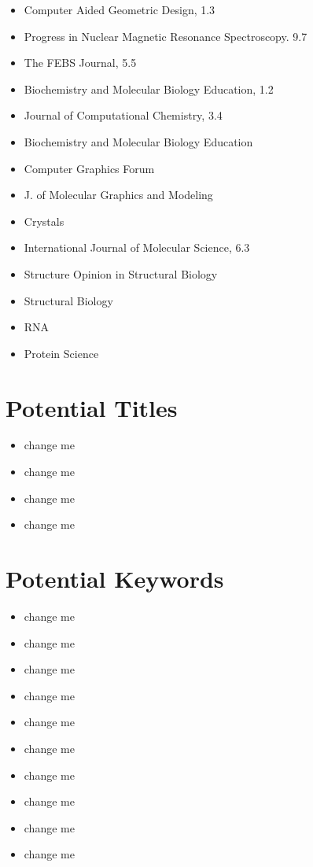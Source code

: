 \documentclass[10pt,letterpaper]{article}
\begin{document}
\begin{itemize}
\item Computer Aided Geometric Design, 1.3    
\item Progress in Nuclear Magnetic Resonance Spectroscopy. 9.7
\item The FEBS Journal, 5.5
\item Biochemistry and Molecular Biology Education, 1.2
\item Journal of Computational Chemistry, 3.4
\item Biochemistry and Molecular Biology Education
\item Computer Graphics Forum
\item J. of Molecular Graphics and Modeling
\item Crystals
\item International Journal of Molecular Science, 6.3
\item Structure Opinion in Structural Biology
\item Structural Biology   
\item RNA
\item Protein Science
\end{itemize}


\section{Potential Titles}

\begin{itemize}
\item change me
\item change me
\item change me
\item change me
\end{itemize}

\section{Potential Keywords}

\begin{itemize}
\item change me
\item change me
\item change me
\item change me
\item change me
\item change me
\item change me
\item change me
\item change me
\item change me
\end{itemize}
\end{document}
